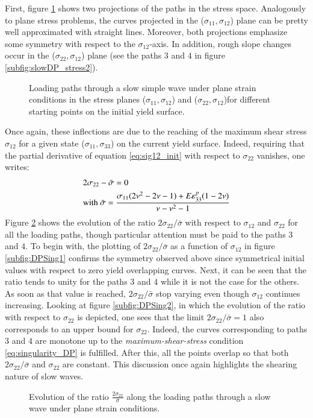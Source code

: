 First, figure \ref{fig:slow_path_plane_strains1} shows two projections of the paths in the stress space.
Analogously to plane stress problems, the curves projected in the ($\sigma_{11},\sigma_{12}$) plane can be pretty well approximated with straight lines.
Moreover, both projections emphasize some symmetry with respect to the $\sigma_{12}$-axis.
In addition, rough slope changes occur in the ($\sigma_{22},\sigma_{12}$) plane (see the paths $3$ and $4$ in figure \ref{subfig:slowDP_stress2}).
\begin{figure}[h!]
  \centering
  { \label{subfig:slowDP_stress1} }
  { \label{subfig:slowDP_stress2} }
  
  \caption{Loading paths through a slow simple wave under plane strain conditions in the stress planes ($\sigma_{11},\sigma_{12}$) and ($\sigma_{22},\sigma_{12}$)for different starting points on the initial yield surface.}
  \label{fig:slow_path_plane_strains1}
\end{figure}
Once again, these inflections are due to the reaching of the maximum shear stress $\sigma_{12}$ for a given state ($\sigma_{11},\sigma_{33}$) on the current yield surface.
Indeed, requiring that the partial derivative of equation \eqref{eq:sig12_init} with respect to $\sigma_{22}$ vanishes, one writes:
\begin{align}
  \label{eq:singularity_DP}
  & 2\sigma_{22} - \bar{\sigma}= 0\\
  & \text{with }\bar{\sigma }=\frac{\sigma_{11}(2\nu^2-2\nu-1) +E\varepsilon^p_{33}(1-2\nu)}{\nu-\nu^2-1}
\end{align}
Figure \ref{fig:DP_slow_sing} shows the evolution of the ratio $2\sigma_{22}/\bar{\sigma}$ with respect to $\sigma_{12}$ and $\sigma_{22}$ for all the loading paths, though particular attention must be paid to the paths $3$ and $4$.
To begin with, the plotting of $2\sigma_{22}/\bar{\sigma}$ as a function of $\sigma_{12}$ in figure \ref{subfig:DPSing1} confirms the symmetry observed above since symmetrical initial values with respect to zero yield overlapping curves.
Next, it can be seen that the ratio tends to unity for the paths $3$ and $4$ while it is not the case for the others.
As soon as that value is reached, $2\sigma_{22}/\bar{\sigma}$ stop varying even though $\sigma_{12}$ continues increasing.
Looking at figure \ref{subfig:DPSing2}, in which the evolution of the ratio with respect to $\sigma_{22}$ is depicted, one sees that the limit $2\sigma_{22}/\bar{\sigma}=1$ also corresponds to an upper bound for $\sigma_{22}$.
Indeed, the curves corresponding to paths $3$ and $4$ are monotone up to the \textit{maximum-shear-stress} condition \eqref{eq:singularity_DP} is fulfilled.
After this, all the points overlap so that both $2\sigma_{22}/\bar{\sigma}$ and $\sigma_{22}$ are constant.
This discussion once again highlights the shearing nature of slow waves.
\begin{figure}[h!]
  \centering
  { \label{subfig:DPSing1}}
  { \label{subfig:DPSing2}}
  
  \caption{Evolution of the ratio $\frac{2\sigma_{22}}{\bar{\sigma}}$ along the loading paths through a slow wave under plane strain conditions.}
  \label{fig:DP_slow_sing}
\end{figure}

